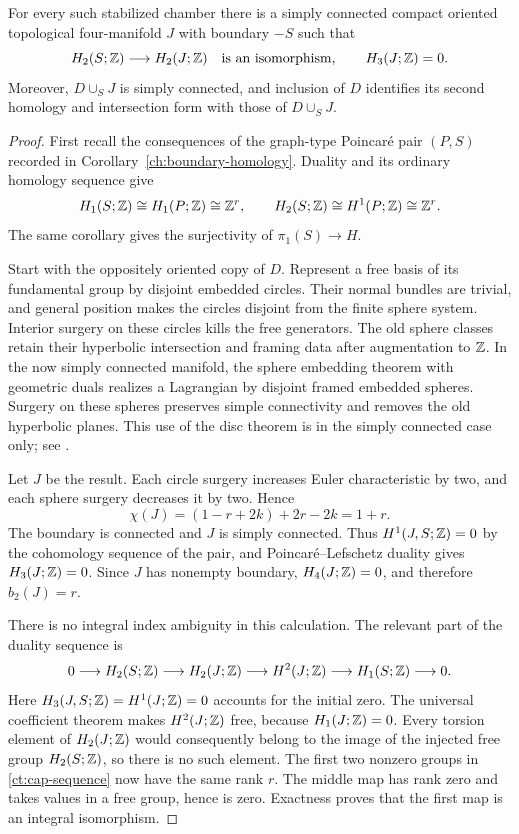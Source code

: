 \begin{lemma}\label{ct:fillings}
For every such stabilized chamber there is a simply connected compact
oriented topological four-manifold $J$ with boundary $-S$ such that
\[
 H_2(S;\mathbb Z)\longrightarrow H_2(J;\mathbb Z)
 \quad\text{is an isomorphism},\qquad H_3(J;\mathbb Z)=0.
\]
Moreover, $D\cup_S J$ is simply connected, and inclusion of $D$ identifies
its second homology and intersection form with those of $D\cup_S J$.
\end{lemma}

\begin{proof}
First recall the consequences of the graph-type Poincar\'e pair $(P,S)$
recorded in Corollary~\ref{ch:boundary-homology}.  Duality and its
ordinary homology sequence give
\begin{equation}\label{ct:boundary-homology}
 H_1(S;\mathbb Z)\cong H_1(P;\mathbb Z)\cong\mathbb Z^r,
 \qquad H_2(S;\mathbb Z)\cong H^1(P;\mathbb Z)\cong\mathbb Z^r.
\end{equation}
The same corollary gives the surjectivity of $\pi_1(S)\to H$.

Start with the oppositely oriented copy of $D$.  Represent a free basis
of its fundamental group by disjoint embedded circles.  Their normal
bundles are trivial, and general position makes the circles disjoint
from the finite sphere system.  Interior surgery on these circles kills
the free generators.  The old sphere classes retain their hyperbolic
intersection and framing data after augmentation to $\mathbb Z$.  In the now
simply connected manifold, the sphere embedding theorem with geometric
duals realizes a Lagrangian by disjoint framed embedded spheres.  Surgery
on these spheres preserves simple connectivity and removes the old
hyperbolic planes.  This use of the disc theorem is in the simply
connected case only; see \cite[Theorem~B]{PRT}.

Let $J$ be the result.  Each circle surgery increases Euler characteristic
by two, and each sphere surgery decreases it by two.  Hence
\[
 \chi(J)=(1-r+2k)+2r-2k=1+r.
\]
The boundary is connected and $J$ is simply connected.  Thus
$H^1(J,S;\mathbb Z)=0$ by the cohomology sequence of the pair, and
Poincar\'e--Lefschetz duality gives $H_3(J;\mathbb Z)=0$.  Since $J$ has nonempty
boundary, $H_4(J;\mathbb Z)=0$, and therefore $b_2(J)=r$.

There is no integral index ambiguity in this calculation.  The relevant
part of the duality sequence is
\begin{equation}\label{ct:cap-sequence}
 0\longrightarrow H_2(S;\mathbb Z)\longrightarrow H_2(J;\mathbb Z)
 \longrightarrow H^2(J;\mathbb Z)\longrightarrow H_1(S;\mathbb Z)
 \longrightarrow0.
\end{equation}
Here $H_3(J,S;\mathbb Z)=H^1(J;\mathbb Z)=0$ accounts for the initial zero.
The universal coefficient theorem makes $H^2(J;\mathbb Z)$ free, because
$H_1(J;\mathbb Z)=0$.  Every torsion element of $H_2(J;\mathbb Z)$ would consequently
belong to the image of the injected free group $H_2(S;\mathbb Z)$, so there is
no such element.  The first two nonzero groups in
\eqref{ct:cap-sequence} now have the same rank $r$.  The middle map has
rank zero and takes values in a free group, hence is zero.  Exactness
proves that the first map is an integral isomorphism.


\end{proof}
